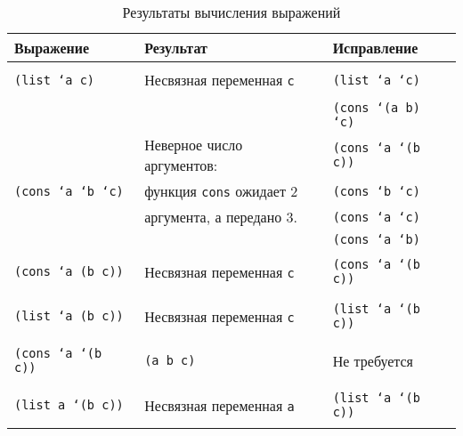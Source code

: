 \begin{landscape}
\begin{table}[!ht]
    \small
	\begin{center}
		\caption{Результаты вычисления выражений}
		\label{tbl:4-1}
		\begin{tabular}{|l|l|l|}
			\hline
			\bfseries Выражение & \bfseries Результат & \bfseries Исправление \\\hline
			& & \\ 
            \texttt{(list `a c)} & Несвязная переменная \texttt{c} &
            \texttt{(list `a `c)} \\
            & & \\\hline
            
            & & \texttt{(cons `(a b) `c)} \\\cline{3-3} 
            & Неверное число аргументов:  & \texttt{(cons `a `(b c))} \\\cline{3-3} 
            \texttt{(cons `a `b `c)}  & функция \texttt{cons} ожидает 2 & \texttt{(cons `b `c)} \\\cline{3-3} 
            & аргумента, а передано 3. & \texttt{(cons `a `c)} \\\cline{3-3} 
            & & \texttt{(cons `a `b)} \\\hline 
            
            & & \\ 
            \texttt{(cons `a (b c))} & Несвязная переменная \texttt{c} & \texttt{(cons `a `(b c))} \\
            & & \\\hline
            
            & & \\ 
            \texttt{(list `a (b c))} & Несвязная переменная \texttt{c} & \texttt{(list `a `(b c))} \\
            & & \\\hline 
            
            & & \\ 
            \texttt{(cons `a `(b c))} &\texttt{(a b c)} & Не требуется \\
            & & \\\hline
            
            & & \\ 
            \texttt{(list a `(b c))} & Несвязная переменная \texttt{a} & \texttt{(list `a `(b c))} \\
            & & \\\hline 
            

\end{tabular}
\end{center}
\end{table}
\end{landscape}

